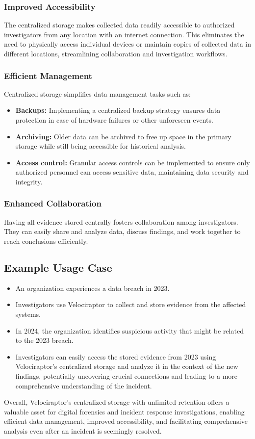 \documentclass[a4paper, 11pt, oneside]{article} %
\begin{document}
\subsubsection{Improved Accessibility}The centralized storage makes collected data readily accessible to authorized investigators from any location with an internet connection. This eliminates the need to physically access individual devices or maintain copies of collected data in different locations, streamlining collaboration and investigation workflows.
\subsubsection{Efficient Management}Centralized storage simplifies data management tasks such as: 
\begin{itemize}
    \item \textbf{Backups: }Implementing a centralized backup strategy ensures data protection in case of hardware failures or other unforeseen events.
    \item \textbf{Archiving: } Older data can be archived to free up space in the primary storage while still being accessible for historical analysis.
    \item \textbf{Access control: }Granular access controls can be implemented to ensure only authorized personnel can access sensitive data, maintaining data security and integrity.
\end{itemize}
\subsubsection{Enhanced Collaboration} Having all evidence stored centrally fosters collaboration among investigators. They can easily share and analyze data, discuss findings, and work together to reach conclusions efficiently.
\subsection{Example Usage Case}
\begin{itemize}
    \item An organization experiences a data breach in 2023.
    \item Investigators use Velociraptor to collect and store evidence from the affected systems.
    \item In 2024, the organization identifies suspicious activity that might be related to the 2023 breach.
    \item Investigators can easily access the stored evidence from 2023 using Velociraptor's centralized storage and analyze it in the context of the new findings, potentially uncovering crucial connections and leading to a more comprehensive understanding of the incident.
\end{itemize}
Overall, Velociraptor's centralized storage with unlimited retention offers a valuable asset for digital forensics and incident response investigations, enabling efficient data management, improved accessibility, and facilitating comprehensive analysis even after an incident is seemingly resolved.
\end{document}
